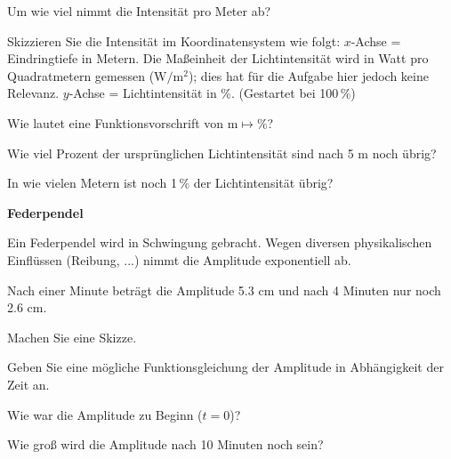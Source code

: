 \begin{bbwAufgabenBlock}

 \item Um wie viel nimmt die Intensität pro Meter ab? 
  
\item Skizzieren Sie die Intensität im Koordinatensystem wie folgt:
   $x$-Achse = Eindringtiefe in Metern. Die Maßeinheit der
   Lichtintensität wird in Watt pro Quadratmetern gemessen ($\textrm{W}/\textrm{m}^2$); dies
   hat für die Aufgabe hier jedoch keine Relevanz.
   $y$-Achse = Lichtintensität in \%. (Gestartet bei 100\,\%)
\item Wie lautet eine Funktionsvorschrift von $\textrm{m}\mapsto \%$?
\item Wie viel Prozent der ursprünglichen Lichtintensität sind nach 5
   m noch übrig? 

\item In wie vielen Metern ist noch 1\,\% der Lichtintensität übrig?
\end{bbwAufgabenBlock}
\platzFuerBerechnungenBisEndeSeite{}




\bbwActAufgabenNr{} \textbf{Federpendel}

Ein Federpendel wird in Schwingung gebracht. Wegen diversen
physikalischen Einflüssen (Reibung, ...) nimmt die Amplitude
exponentiell ab.

Nach einer Minute beträgt die Amplitude 5.3 cm und nach 4 Minuten nur noch
2.6 cm.

\begin{bbwAufgabenBlock}

\item Machen Sie eine Skizze.
\item Geben Sie eine mögliche Funktionsgleichung der Amplitude in Abhängigkeit
der Zeit an.
      
\item Wie war die Amplitude zu Beginn ($t=0$)?

\item Wie groß wird die Amplitude nach 10 Minuten noch sein?
\end{bbwAufgabenBlock}
\platzFuerBerechnungenBisEndeSeite{}




